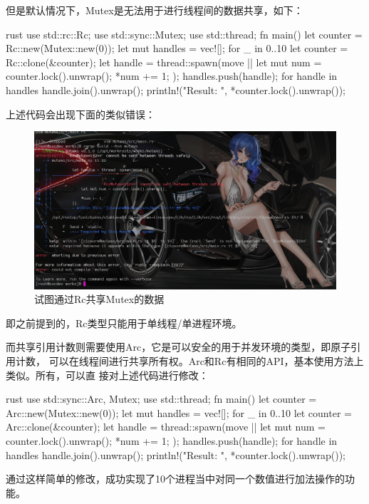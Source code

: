 但是默认情况下，Mutex是无法用于进行线程间的数据共享，如下：
\begin{code-block}{rust}
use std::rc::Rc;
use std::sync::Mutex;
use std::thread;
fn main() {
    let counter = Rc::new(Mutex::new(0));
    let mut handles = vec![];
    for _ in 0..10 {
        let counter = Rc::clone(&counter);
        let handle = thread::spawn(move || {
            let mut num = counter.lock().unwrap();
            *num += 1;
        });
        handles.push(handle);
    }
    for handle in handles {
        handle.join().unwrap();
    }
    println!("Result: {}", *counter.lock().unwrap());
}
\end{code-block}
上述代码会出现下面的类似错误：
\begin{figure}[H]
  \centering
  \includegraphics[scale=0.215]{rust_mutex_share_error.png}
  \caption{试图通过Rc共享Mutex的数据}
  \label{fig:rust_mutex_share_error}
\end{figure}
即之前提到的，Rc类型只能用于单线程/单进程环境。

而共享引用计数则需要使用Arc，它是可以安全的用于并发环境的类型，即原子引用计数，
可以在线程间进行共享所有权。Arc和Rc有相同的API，基本使用方法上类似。所有，可以直
接对上述代码进行修改：
\begin{code-block}{rust}
use std::sync::{Arc, Mutex};
use std::thread;
fn main() {
    let counter = Arc::new(Mutex::new(0));
    let mut handles = vec![];
    for _ in 0..10 {
        let counter = Arc::clone(&counter);
        let handle = thread::spawn(move || {
            let mut num = counter.lock().unwrap();
            *num += 1;
        });
        handles.push(handle);
    }
    for handle in handles {
        handle.join().unwrap();
    }
    println!("Result: {}", *counter.lock().unwrap());
}
\end{code-block}
通过这样简单的修改，成功实现了10个进程当中对同一个数值进行加法操作的功能。

